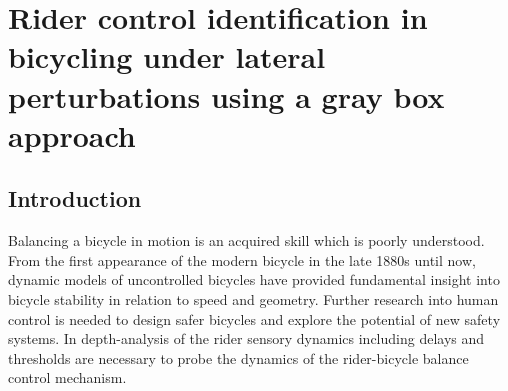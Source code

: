\chapter{Rider control identification in bicycling under lateral perturbations using a gray box approach} \label{hapticFB}

\section{Introduction}

Balancing a bicycle in motion is an acquired skill which is poorly understood. From the first appearance of the modern bicycle in the late 1880s until now, dynamic models of uncontrolled bicycles have provided fundamental insight into bicycle stability in relation to speed and geometry\cite{meijaard2007linearized, kooijman2011bicycle}. Further research into human control is needed to design safer bicycles and explore the potential of new safety systems.  In depth-analysis of the rider sensory dynamics  including delays and thresholds are necessary to probe the dynamics of the rider-bicycle balance control mechanism.

